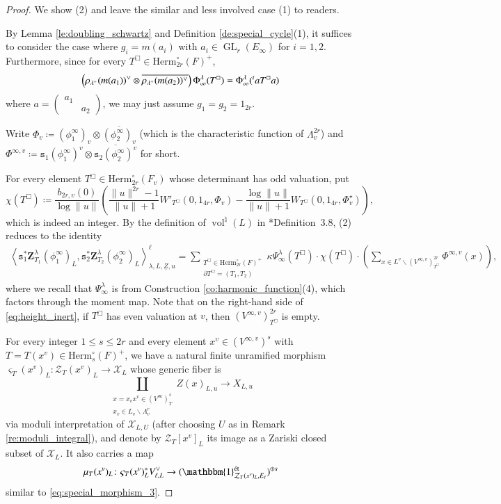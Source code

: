 \documentclass[12pt]{amsart}
\numberwithin{equation}{section}
\theoremstyle{plain}
\theoremstyle{definition}
\theoremstyle{remark}
\renewcommand{\c}[1]{\mathcal{#1}}
\renewcommand{\r}[1]{\mathrm{#1}}
\renewcommand{\(}{\left(}
\renewcommand{\)}{\right)}
\newcommand{\ol}[1]{\overline{#1}{}}
\newcommand{\ul}{\underline}
\renewcommand{\leq}{\leqslant}
\newcommand{\cX}{\c X}
\newcommand{\cZ}{\c Z}
\newcommand{\ts}{\mathtt{s}}
\newcommand{\bbZ}{\boldsymbol{Z}}
\newcommand{\llangle}{\left\langle}
\newcommand{\rrangle}{\right\rangle}
\newcommand{\pres}[2]{\prescript{#1}{}{#2}}
\newcommand{\et}{{\acute{\r{e}}\r{t}}}
\newcommand{\Herm}{\r{Herm}}
\DeclareMathOperator{\GL}{GL}
\DeclareMathOperator{\vol}{vol}
\begin{document}
\begin{proof}
We show (2) and leave the similar and less involved case (1) to readers.

By Lemma \ref{le:doubling_schwartz} and Definition \ref{de:special_cycle}(1), it suffices to consider the case where $g_i=m(a_i)$ with $a_i\in\GL_r(E_\infty)$ for $i=1,2$. Furthermore, since for every $T^\Box\in\Herm_{2r}^\circ(F)^+$,
\[
\(\rho_{\lambda^+}(m(a_1))^\vee\otimes\ol{\rho_{\lambda^+}(m(a_2))^\vee}\)\Phi^\lambda_\infty(T^\Box)
=\Phi^\lambda_\infty(\pres{t}a T^\Box a)
\]
where $a=\(\begin{smallmatrix} a_1 &  \\  & a_2 \end{smallmatrix}\)$, we may just assume $g_1=g_2=1_{2r}$.

Write $\Phi_v\coloneqq(\phi^\infty_1)_v\otimes\ol{(\phi^\infty_2)_v}$ (which is the characteristic function of $\Lambda_v^{2r}$) and $\Phi^{\infty,v}\coloneqq\ts_1(\phi^\infty_1)^v\otimes\ol{\ts_2(\phi^\infty_2)^v}$ for short.

For every element $T^\Box\in\Herm_{2r}^\circ(F_v)$ whose determinant has odd valuation, put
\[
\chi(T^\Box)\coloneqq\frac{b_{2r,v}(0)}{\log\|u\|}\(\frac{\|u\|^{2r}-1}{\|u\|+1}W'_{T^\Box}(0,1_{4r},\Phi_v)
-\frac{\log\|u\|}{\|u\|+1}W_{T^\Box}(0,1_{4r},\Phi_v^\star)\),
\]
which is indeed an integer. By the definition of $\vol^\natural(L)$ in \cite{LL21}*{Definition~3.8}, (2) reduces to the identity
\begin{align}\label{eq:height_inert}
\llangle\ts_1^*\bbZ^\lambda_{T_1}(\phi^\infty_1)_L,\ts_2^*\bbZ^\lambda_{T_2}(\phi^\infty_2)_L\rrangle_{\lambda,L,\ul{Z},u}^\ell
=\sum_{\substack{T^\Box\in\Herm_{2r}^\circ(F)^+\\ \partial T^\Box=(T_1,T_2)}}
\kappa\Psi^\lambda_\infty(T^\Box)\cdot\chi(T^\Box)\cdot\(\sum_{x\in L^v\backslash (V^{\infty,v})^{2r}_{T^\Box}}
\Phi^{\infty,v}(x)\),
\end{align}
where we recall that $\Psi^\lambda_\infty$ is from Construction \ref{co:harmonic_function}(4), which factors through the moment map. Note that on the right-hand side of \eqref{eq:height_inert}, if $T^\Box$ has even valuation at $v$, then $(V^{\infty,v})^{2r}_{T^\Box}$ is empty.

For every integer $1\leq s\leq 2r$ and every element $x^v\in(V^{\infty,v})^s$ with $T=T(x^v)\in\Herm_s^\circ(F)^+$, we have a natural finite unramified morphism $\varsigma_T(x^v)_L\colon\cZ_T(x^v)_L\to\cX_L$ whose generic fiber is
\[
\coprod_{\substack{x=x_v x^v \in (V^\infty)^s_T \\ x_v\in L_v\backslash\Lambda_v^r}} Z(x)_{L,u} \to X_{L,u}
\]
via moduli interpretation of $\cX_{L,U}$ (after choosing $U$ as in Remark \ref{re:moduli_integral}), and denote by $\cZ_T[x^v]_L$ its image as a Zariski closed subset of $\cX_L$. It also carries a map
\begin{align}\label{eq:special_morphism_4}
\mu_T(x^v)_L\colon\varsigma_T(x^v)_L^*V_{\ell,L}^\vee\to(\mathbbm{1}^\et_{\cZ_T(x^v)_L,E_\ell})^{\oplus s}
\end{align}
similar to \eqref{eq:special_morphism_3}.


\end{proof}
\end{document}
